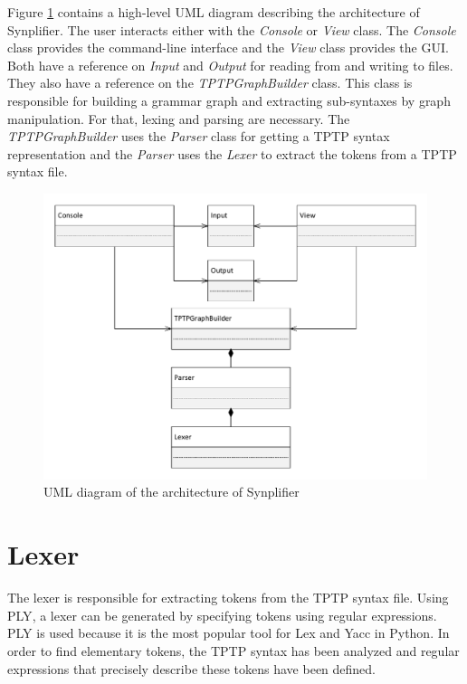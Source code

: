 Figure \ref{fig:ConceptArchitectureOverview} contains a high-level UML diagram describing the architecture of \ac{Synplifier}. The user interacts either with the \textit{Console} or \textit{View} class. The \textit{Console} class provides the command-line interface and the \textit{View} class provides the GUI. Both have a reference on \textit{Input} and \textit{Output} for reading from and writing to files. They also have a reference on the \textit{TPTPGraphBuilder} class. This class is responsible for building a grammar graph and extracting sub-syntaxes by graph manipulation. For that, lexing and parsing are necessary. The \textit{TPTPGraphBuilder} uses the \textit{Parser} class for getting a \ac{TPTP} syntax representation and the \textit{Parser} uses the \textit{Lexer} to extract the tokens from a \ac{TPTP} syntax file.
\begin{figure}[H]
\centering
\includegraphics[width=1\textwidth]{images/Concept_UML_Architecture_Overview.pdf}
\caption{UML diagram of the architecture of \ac{Synplifier}}
\label{fig:ConceptArchitectureOverview}
\end{figure}

\section{Lexer}\label{sec:ConceptLexer}
The lexer is responsible for extracting tokens from the \ac{TPTP} syntax file. Using \ac{PLY}, a lexer can be generated by specifying tokens using regular expressions. \ac{PLY} is used because it is the most popular tool for Lex and Yacc in Python.
In order to find elementary tokens, the \ac{TPTP} syntax has been analyzed and regular expressions that precisely describe these tokens have been defined.

